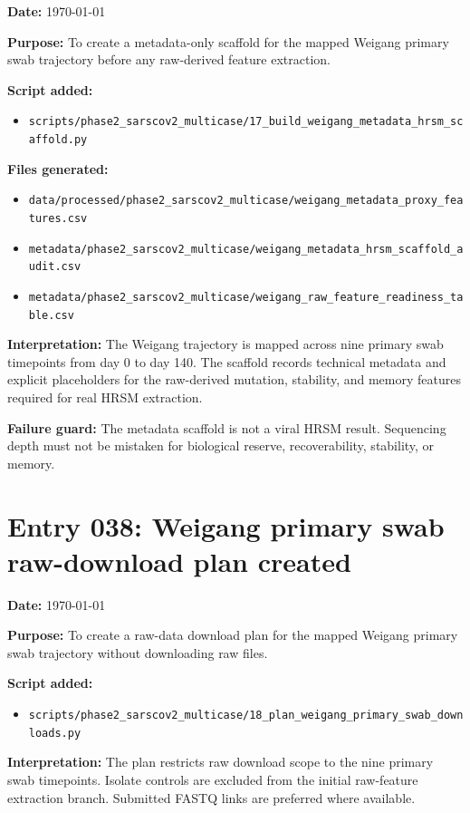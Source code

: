 \textbf{Date:} \today

\textbf{Purpose:} To create a metadata-only scaffold for the mapped Weigang primary swab trajectory before any raw-derived feature extraction.

\textbf{Script added:}
\begin{itemize}
    \item \texttt{scripts/phase2\_sarscov2\_multicase/17\_build\_weigang\_metadata\_hrsm\_scaffold.py}
\end{itemize}

\textbf{Files generated:}
\begin{itemize}
    \item \texttt{data/processed/phase2\_sarscov2\_multicase/weigang\_metadata\_proxy\_features.csv}
    \item \texttt{metadata/phase2\_sarscov2\_multicase/weigang\_metadata\_hrsm\_scaffold\_audit.csv}
    \item \texttt{metadata/phase2\_sarscov2\_multicase/weigang\_raw\_feature\_readiness\_table.csv}
\end{itemize}

\textbf{Interpretation:} The Weigang trajectory is mapped across nine primary swab timepoints from day 0 to day 140. The scaffold records technical metadata and explicit placeholders for the raw-derived mutation, stability, and memory features required for real HRSM extraction.

\textbf{Failure guard:} The metadata scaffold is not a viral HRSM result. Sequencing depth must not be mistaken for biological reserve, recoverability, stability, or memory.

\section*{Entry 038: Weigang primary swab raw-download plan created}

\textbf{Date:} \today

\textbf{Purpose:} To create a raw-data download plan for the mapped Weigang primary swab trajectory without downloading raw files.

\textbf{Script added:}
\begin{itemize}
    \item \texttt{scripts/phase2\_sarscov2\_multicase/18\_plan\_weigang\_primary\_swab\_downloads.py}
\end{itemize}

\textbf{Interpretation:} The plan restricts raw download scope to the nine primary swab timepoints. Isolate controls are excluded from the initial raw-feature extraction branch. Submitted FASTQ links are preferred where available.

